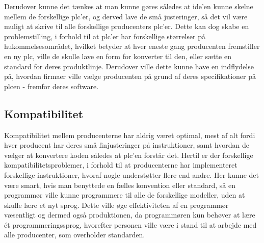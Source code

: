 Derudover kunne det tænkes at man kunne gøres således at \gls{ide}'en kunne skelne mellem de forskellige \gls{plc}'er, og derved lave de små justeringer, så det vil være muligt at skrive til alle forskellige producenters \gls{plc}'er.
Dette kan dog skabe en problemstilling, i forhold til at \gls{plc}'er har forskellige størrelser på hukommelsesområdet, hvilket betyder at hver eneste gang producenten fremstiller en ny \gls{plc}, ville de skulle lave en form for konverter til den, eller sætte en standard for deres produktlinje.
Derudover ville dette kunne have en indflydelse på, hvordan firmaer ville vælge producenten på grund af deres specifikationer på \gls{plc}en - fremfor deres software.

\subsection*{Kompatibilitet}
Kompatibilitet mellem producenterne har aldrig været optimal, mest af alt fordi hver producent har deres små finjusteringer på instruktioner, samt hvordan de vælger at konvertere koden således at \gls{plc}'en forstår det.
Hertil er der forskellige kompatibilitetsproblemer, i forhold til at producenterne har implementeret forskellige instruktioner, hvoraf nogle understøtter flere end andre.
Her kunne det være smart, hvis man benyttede en fælles konvention eller standard, så en programmør ville kunne programmere til alle de forskellige modeller, uden at skulle lære et nyt sprog.
Dette ville øge effektiviteten af en programmør væsentligt og dermed også produktionen, da programmøren kun behøver at lære ét programmeringssprog, hvorefter personen ville være i stand til at arbejde med alle producenter, som overholder standarden.